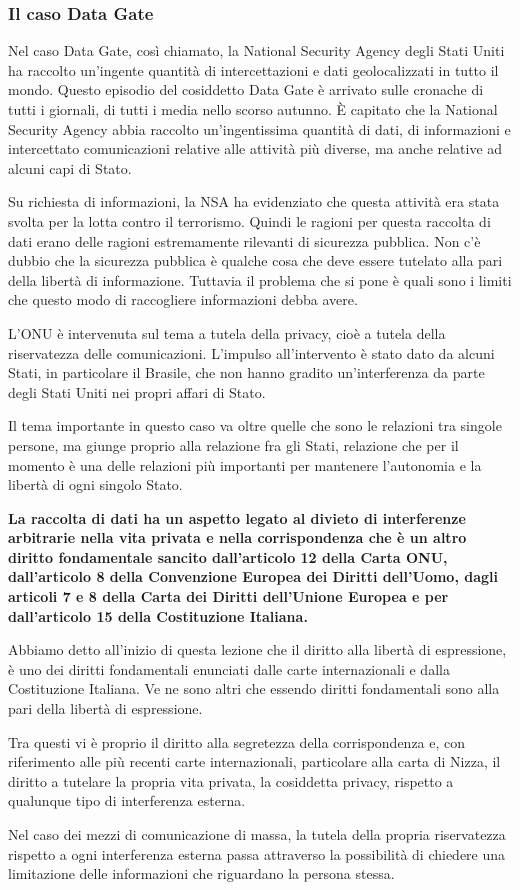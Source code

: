 \subsubsection{Il caso Data Gate}
Nel caso Data Gate, così chiamato, la National Security Agency degli Stati Uniti ha raccolto un'ingente quantità di intercettazioni e dati geolocalizzati in tutto il mondo. Questo episodio del cosiddetto Data Gate è arrivato sulle cronache di tutti i giornali, di tutti i media nello scorso autunno. È capitato che la National Security Agency abbia raccolto un'ingentissima quantità di dati, di informazioni e intercettato comunicazioni relative alle attività più diverse, ma anche relative ad alcuni capi di Stato.\par
Su richiesta di informazioni, la NSA ha evidenziato che questa attività era stata svolta per la lotta contro il terrorismo. Quindi le ragioni per questa raccolta di dati erano delle ragioni estremamente rilevanti di sicurezza pubblica. Non c'è dubbio che la sicurezza pubblica è qualche cosa che deve essere tutelato alla pari della libertà di informazione. Tuttavia il problema che si pone è quali sono i limiti che questo modo di raccogliere informazioni debba avere.\par
L'ONU è intervenuta sul tema a tutela della privacy, cioè a tutela della riservatezza delle comunicazioni. L'impulso all'intervento è stato dato da alcuni Stati, in particolare il Brasile, che non hanno gradito un'interferenza da parte degli Stati Uniti nei propri affari di Stato.\par
Il tema importante in questo caso va oltre quelle che sono le relazioni tra singole persone, ma giunge proprio alla relazione fra gli Stati, relazione che per il momento è una delle relazioni più importanti per mantenere l'autonomia e la libertà di ogni singolo Stato. \par
\textbf{La raccolta di dati ha un aspetto legato al divieto di interferenze arbitrarie nella vita privata e nella corrispondenza che è un altro diritto fondamentale sancito dall'articolo 12 della Carta ONU, dall'articolo 8 della Convenzione Europea dei Diritti dell'Uomo, dagli articoli 7 e 8 della Carta dei Diritti dell'Unione Europea e per dall'articolo 15 della Costituzione Italiana.}\par
Abbiamo detto all'inizio di questa lezione che il diritto alla libertà di espressione, è uno dei diritti fondamentali enunciati dalle carte internazionali e dalla Costituzione Italiana. Ve ne sono altri che essendo diritti fondamentali sono alla pari della libertà di espressione. \par
Tra questi vi è proprio il diritto alla segretezza della corrispondenza e, con riferimento alle più recenti carte internazionali, particolare alla carta di Nizza, il diritto a tutelare la propria vita privata, la cosiddetta privacy, rispetto a qualunque tipo di interferenza esterna.\par
Nel caso dei mezzi di comunicazione di massa, la tutela della propria riservatezza rispetto a ogni interferenza esterna passa attraverso la possibilità di chiedere una limitazione delle informazioni che riguardano la persona stessa.\par
